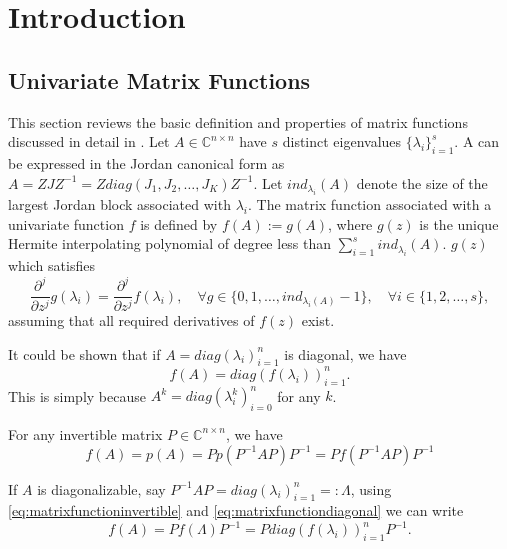 \section{Introduction}

\subsection{Univariate Matrix Functions}
This section reviews the basic definition and properties of matrix functions discussed in detail in
\cite{higham2008functions}.
Let $A \in \mathbb{C}^{n \times n}$ have $s$ distinct eigenvalues $\{\lambda_i\}_{i=1}^{s}$. A can be
expressed in the Jordan canonical form as $A = ZJZ^{-1} = Z diag(J_1, J_2, \dots, J_K) Z^{-1}$. Let
$ind_{\lambda_i}(A)$ denote the size of the largest Jordan block associated with $\lambda_i$. The matrix
function associated with a univariate function $f$ is defined by $f(A) := g(A)$, where $g(z)$ is the unique
Hermite interpolating polynomial of degree less than $\sum_{i=1}^{s}{ind_{\lambda_i}(A)}$. $g(z)$ which
satisfies
\begin{equation}
    \frac{\partial^j}{\partial z^j}g(\lambda_i) = \frac{\partial^j}{\partial z^j}f(\lambda_i),
    \quad \forall g \in \{0, 1, \dots, ind_{\lambda_i(A)}-1\},
    \quad \forall i \in \{1, 2, \dots, s\},
\end{equation}
assuming that all required derivatives of $f(z)$ exist.

It could be shown that if $A = diag(\lambda_i)_{i=1}^{n}$ is diagonal, we have
\begin{equation}
    \label{eq:matrixfunctiondiagonal}
    f(A) = diag(f(\lambda_i))_{i=1}^{n}.
\end{equation}
This is simply because $A^k = diag(\lambda_i^k)_{i=0}^{n}$ for any $k$.

For any invertible matrix $P \in \mathbb{C}^{n \times n}$, we have
\begin{equation}
    \label{eq:matrixfunctioninvertible}
    f(A) = p(A) = Pp(P^{-1}AP)P^{-1} = Pf(P^{-1}AP)P^{-1}
\end{equation}

If $A$ is diagonalizable, say $P^{-1}AP = diag(\lambda_i)_{i=1}^{n} =: \Lambda$,
using \autoref{eq:matrixfunctioninvertible} and \autoref{eq:matrixfunctiondiagonal}
we can write
\begin{equation}
    f(A) = P f(\Lambda) P^{-1} = P diag(f(\lambda_i))_{i=1}^{n} P^{-1}.
\end{equation}

